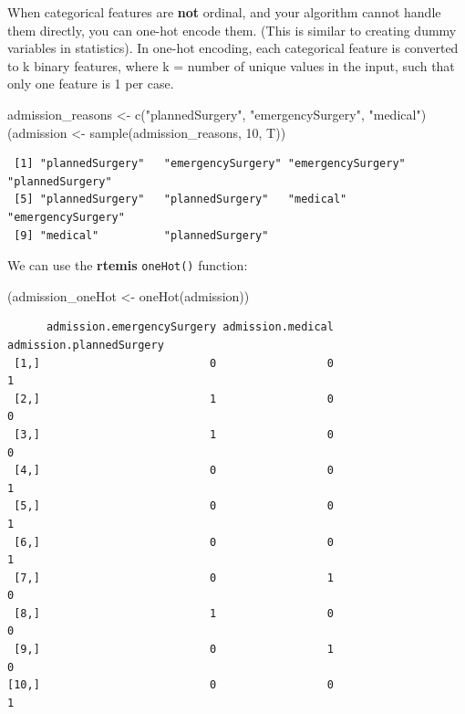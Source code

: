 \documentclass[
]{book}
\newenvironment{Shaded}{\begin{snugshade}}{\end{snugshade}}
\newcommand{\DecValTok}[1]{\textcolor[rgb]{0.00,0.00,0.81}{#1}}
\newcommand{\FunctionTok}[1]{\textcolor[rgb]{0.00,0.00,0.00}{#1}}
\newcommand{\NormalTok}[1]{#1}
\newcommand{\OtherTok}[1]{\textcolor[rgb]{0.56,0.35,0.01}{#1}}
\newcommand{\StringTok}[1]{\textcolor[rgb]{0.31,0.60,0.02}{#1}}
\begin{document}
When categorical features are \textbf{not} ordinal, and your algorithm cannot handle them directly, you can one-hot encode them. (This is similar to creating dummy variables in statistics). In one-hot encoding, each categorical feature is converted to k binary features, where k = number of unique values in the input, such that only one feature is 1 per case.

\begin{Shaded}
\begin{Highlighting}[]
\NormalTok{admission\_reasons }\OtherTok{\textless{}{-}} \FunctionTok{c}\NormalTok{(}\StringTok{"plannedSurgery"}\NormalTok{, }\StringTok{"emergencySurgery"}\NormalTok{, }\StringTok{"medical"}\NormalTok{)}
\NormalTok{(admission }\OtherTok{\textless{}{-}} \FunctionTok{sample}\NormalTok{(admission\_reasons, }\DecValTok{10}\NormalTok{, T))}
\end{Highlighting}
\end{Shaded}

\begin{verbatim}
 [1] "plannedSurgery"   "emergencySurgery" "emergencySurgery" "plannedSurgery"  
 [5] "plannedSurgery"   "plannedSurgery"   "medical"          "emergencySurgery"
 [9] "medical"          "plannedSurgery"  
\end{verbatim}

We can use the \textbf{rtemis} \texttt{oneHot()} function:

\begin{Shaded}
\begin{Highlighting}[]
\NormalTok{(admission\_oneHot }\OtherTok{\textless{}{-}} \FunctionTok{oneHot}\NormalTok{(admission))}
\end{Highlighting}
\end{Shaded}

\begin{verbatim}
      admission.emergencySurgery admission.medical admission.plannedSurgery
 [1,]                          0                 0                        1
 [2,]                          1                 0                        0
 [3,]                          1                 0                        0
 [4,]                          0                 0                        1
 [5,]                          0                 0                        1
 [6,]                          0                 0                        1
 [7,]                          0                 1                        0
 [8,]                          1                 0                        0
 [9,]                          0                 1                        0
[10,]                          0                 0                        1
\end{verbatim}
\end{document}
